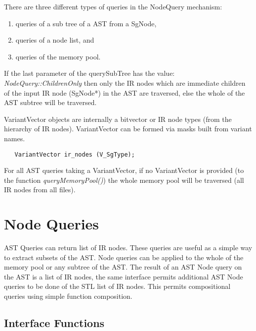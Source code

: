There are three different types of queries in the NodeQuery mechanism:
\begin{enumerate}
   \item queries of a sub tree of a AST from a SgNode, 
   \item queries of a node list, and 
   \item queries of the memory pool. 
\end{enumerate}
If the last parameter of the querySubTree has the value: {\em NodeQuery::ChildrenOnly} 
then only the IR nodes which are immediate children of the input IR node 
(SgNode*) in the AST are traversed, else the whole of the AST subtree will be
traversed. 

VariantVector objects are internally a bitvector or IR node types (from the hierarchy of
IR nodes).  VariantVector can be formed via masks built from variant names.
{\mySmallestFontSize
\begin{verbatim}
   VariantVector ir_nodes (V_SgType);

\end{verbatim}
}

For all AST queries taking a VariantVector, if no VariantVector is provided (to the 
function {\em queryMemoryPool()}) the whole memory pool will be traversed (all IR nodes
from all files).


\section{Node Queries}

    AST Queries can return list of IR nodes.  These queries are useful
as a simple way to extract subsets of the AST.  Node queries can be applied to 
the whole of the memory pool or any subtree of the AST.  The result of
an AST Node query on the AST is a list of IR nodes, the same interface
permits additional AST Node queries to be done of the STL list of IR nodes.
This permits compositional queries using simple function composition.

\subsection{Interface Functions}
   
